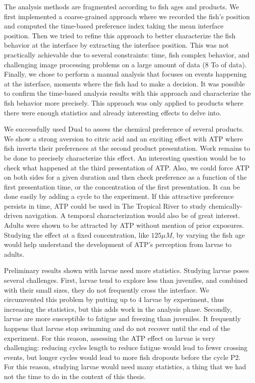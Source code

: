   The analysis methods are fragmented according to fish ages and products. We first implemented a coarse-grained approach where we recorded the fish's position and computed the time-based preference index taking the mean interface position. Then we tried to refine this approach to better characterize the fish behavior at the interface by extracting the interface position. This was not practically achievable due to several constraints: time, fish complex behavior, and challenging image processing problems on a large amount of data (8 To of data). Finally, we chose to perform a manual analysis that focuses on events happening at the interface, moments where the fish had to make a decision. It was possible to confirm the time-based analysis results with this approach and characterize the fish behavior more precisely. This approach was only applied to products where there were enough statistics and already interesting effects to delve into.

  We successfully used Dual to assess the chemical preference of several products. We show a strong aversion to citric acid and an exciting effect with ATP where fish inverts their preferences at the second product presentation. Work remains to be done to precisely characterize this effect. An interesting question would be to check what happened at the third presentation of ATP. Also, we could force ATP on both sides for a given duration and then check preference as a function of the first presentation time, or the concentration of the first presentation. It can be done easily by adding a cycle to the experiment. If this attractive preference persists in time, ATP could be used in The Tropical River to study chemically-driven navigation. A temporal characterization would also be of great interest. Adults were shown to be attracted by ATP without mention of prior exposures. Studying the effect at a fixed concentration, like $125 \mu M$, by varying the fish age would help understand the development of ATP's perception from larvae to adults.

  Preliminary results shown with larvae need more statistics. Studying larvae poses several challenges. First, larvae tend to explore less than juveniles, and combined with their small sizes, they do not frequently cross the interface. We circumvented this problem by putting up to 4 larvae by experiment, thus increasing the statistics, but this adds work in the analysis phase. Secondly, larvae are more susceptible to fatigue and freezing than juveniles. It frequently happens that larvae stop swimming and do not recover until the end of the experiment. For this reason, assessing the ATP effect on larvae is very challenging: reducing cycles length to reduce fatigue would lead to fewer crossing events, but longer cycles would lead to more fish dropouts before the cycle P2. For this reason, studying larvae would need many statistics, a thing that we had not the time to do in the context of this thesis.


